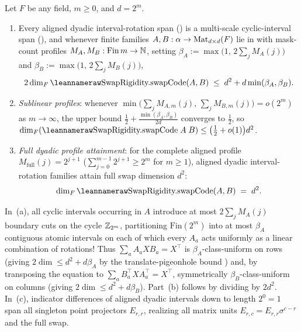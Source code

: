\begin{theorem}\label{thm:multiscale-interval}
Let $F$ be any field, $m \ge 0$, and $d = 2^m$.
\begin{enumerate}[label=(\alph*)]
\item Every aligned dyadic interval-rotation span () is a
  multi-scale cyclic-interval span (), and whenever finite families
  $A, B : \alpha \to \operatorname{Mat}_{d\times d}(F)$ lie in  with mask-count
  profiles $M_A, M_B : \mathrm{Fin}\,m \to \mathbb{N}$, setting
  $\beta_A := \max\bigl(1,\, 2\sum_{j} M_A(j)\bigr)$ and
  $\beta_B := \max\bigl(1,\, 2\sum_{j} M_B(j)\bigr)$,
  \[
    2\dim_F \leanname{SwapRigidity.swapCode}(A, B)
    \;\le\; d^2 + d\min(\beta_A, \beta_B).
  \]
\item \emph{Sublinear profiles}: whenever $\min\bigl(\sum_j M_{A,m}(j),\, \sum_j M_{B,m}(j)\bigr)
  = o(2^m)$ as $m \to \infty$, the upper bound $\frac{1}{2} + \frac{\min(\beta_A,\beta_B)}{2d}$
  converges to $\frac{1}{2}$, so $\dim_F(\leanname{SwapRigidity.swapCode}\;A\;B) \le
  \bigl(\frac{1}{2} + o(1)\bigr)d^2$.
\item \emph{Full dyadic profile attainment}: for the complete aligned profile
  $M_{\mathrm{full}}(j) = 2^{j+1}$ ($\sum_{j=0}^{m-1} 2^{j+1} \ge 2^m$ for $m \ge 1$), aligned
  dyadic interval-rotation families attain full swap dimension $d^2$:
  \[
    \dim_F \leanname{SwapRigidity.swapCode}(A, B) \;=\; d^2.
  \]
\end{enumerate}
\end{theorem}
\begin{outline}
In~(a), all cyclic intervals occurring in $A$ introduce at most $2\sum_j M_A(j)$ boundary cuts on
the cycle $\mathbb{Z}_{2^m}$, partitioning $\mathrm{Fin}(2^m)$ into at most $\beta_A$ contiguous atomic
intervals on each of which every $A_a$ acts uniformly as a linear combination of rotations! Thus
$\sum_a A_a X B_a = X^\top$ is $\beta_A$-class-uniform on rows (giving $2\dim \le d^2 + d\beta_A$ by
the translate-pigeonhole bound \cite[Theorem~6.4]{SeventeenthPaper2026}) and, by transposing the
equation to $\sum_a B_a^\top X A_a^\top = X^\top$, symmetrically $\beta_B$-class-uniform on columns
(giving $2\dim \le d^2 + d\beta_B$). Part~(b) follows by dividing by $2d^2$. In~(c), indicator
differences of aligned dyadic intervals down to length $2^0 = 1$ span all singleton point
projectors $E_{r,r}$, realizing all matrix units $E_{r,c} = E_{r,r}\sigma^{c-r}$ and the full swap.
\end{outline}

